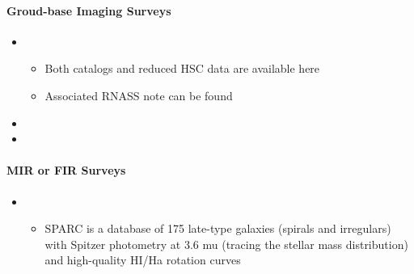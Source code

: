 \documentclass[letterpaper,10pt,english]{sphinxmanual}
\begin{document}
\paragraph{Groud-base Imaging Surveys}
\label{\detokenize{resource/astro/topics/extragalactic_astronomy:groud-base-imaging-surveys}}\begin{itemize}
\item {} 
\begin{itemize}
\item {} 
Both catalogs and reduced HSC data are available here

\item {} 
Associated RNASS note can be found

\end{itemize}

\item {} 

\item {} 

\end{itemize}


\paragraph{MIR or FIR Surveys}
\label{\detokenize{resource/astro/topics/extragalactic_astronomy:mir-or-fir-surveys}}\begin{itemize}
\item {} 
\begin{itemize}
\item {} 
SPARC is a database of 175 late-type galaxies (spirals and
irregulars) with Spitzer photometry at 3.6 mu (tracing the stellar
mass distribution) and high-quality HI/Ha rotation curves

\end{itemize}

\end{itemize}
\end{document}
